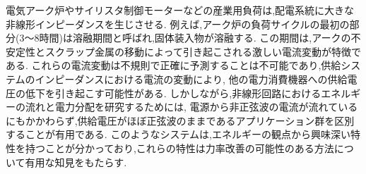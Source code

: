 \documentclass[fleqn,11pt,a4paper,dvipdfmx]{jsarticle}
\begin{document}
電気アーク炉やサイリスタ制御モーターなどの産業用負荷は,配電系統に大きな非線形インピーダンスを生じさせる.
例えば,アーク炉の負荷サイクルの最初の部分(3～8時間)は溶融期間と呼ばれ,固体装入物が溶融する.
この期間は,アークの不安定性とスクラップ金属の移動によって引き起こされる激しい電流変動が特徴である.
これらの電流変動は不規則で正確に予測することは不可能であり,供給システムのインピーダンスにおける電流の変動により,
他の電力消費機器への供給電圧の低下を引き起こす可能性がある.
しかしながら,非線形回路におけるエネルギーの流れと電力分配を研究するためには,
電源から非正弦波の電流が流れているにもかかわらず,供給電圧がほぼ正弦波のままであるアプリケーション群を区別することが有用である.
このようなシステムは,エネルギーの観点から興味深い特性を持つことが分かっており,これらの特性は力率改善の可能性のある方法について有用な知見をもたらす.
%
%
\end{document}
